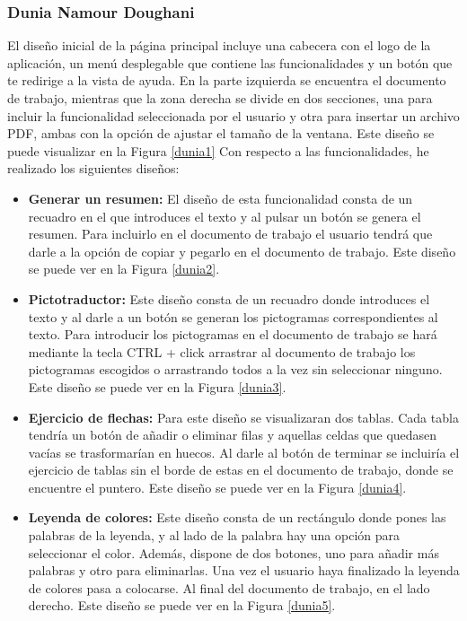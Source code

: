 \subsubsection{Dunia Namour Doughani}
\label{sec:duniaIter}
El diseño inicial de la página principal incluye una cabecera con el logo de la aplicación, un menú desplegable que contiene las funcionalidades y un botón que te redirige a la vista de ayuda. En la parte izquierda se encuentra el documento de trabajo, mientras que la zona derecha se divide en dos secciones, una para incluir la funcionalidad seleccionada por el usuario y otra para insertar un archivo PDF, ambas con la opción de ajustar el tamaño de la ventana. Este diseño se puede visualizar en la Figura \ref{dunia1} Con respecto a las funcionalidades, he realizado los siguientes diseños:
\begin{itemize}
  \item \textbf{Generar un resumen:} El diseño de esta funcionalidad consta de un recuadro en el que introduces el texto y al pulsar un botón se genera el resumen. Para incluirlo en el documento de trabajo el usuario tendrá que darle a la opción de copiar y pegarlo en el documento de trabajo. Este diseño se puede ver en la Figura \ref{dunia2}.
  \item \textbf{Pictotraductor:} Este diseño consta de un recuadro donde introduces el texto y al darle a un botón se generan los pictogramas correspondientes al texto. Para introducir los pictogramas en el documento de trabajo se hará mediante la tecla CTRL + click arrastrar al documento de trabajo los pictogramas escogidos o arrastrando todos a la vez sin seleccionar ninguno. Este diseño se puede ver en la Figura \ref{dunia3}.
  \item \textbf{Ejercicio de flechas:} Para este diseño se visualizaran dos tablas. Cada tabla tendría un botón de añadir o eliminar filas y aquellas celdas que quedasen vacías se trasformarían en huecos. Al darle al botón de terminar se incluiría el ejercicio de tablas sin el borde de estas en el documento de trabajo, donde se encuentre el puntero. Este diseño se puede ver en la Figura \ref{dunia4}.
  \item  \textbf{Leyenda de colores:} Este diseño consta de un rectángulo donde pones las palabras de la leyenda, y al lado de la palabra hay una opción para seleccionar el color. Además, dispone de dos botones, uno para añadir más palabras y otro para eliminarlas. Una vez el usuario haya finalizado la leyenda de colores pasa a colocarse. Al final del documento de trabajo, en el lado derecho. Este diseño se puede ver en la Figura \ref{dunia5}.

\end{itemize}

